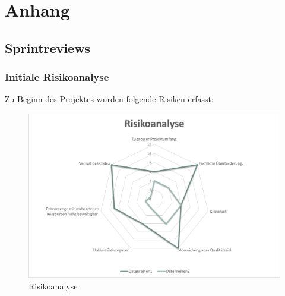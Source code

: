 % 

\chapter{Anhang}
\label{app:sec:Anhang}



%

\section{Sprintreviews}
\subsection*{Initiale Risikoanalyse}
Zu Beginn des Projektes wurden folgende Risiken erfasst:

\begin{figure}[htb]
	\centering
	\includegraphics[keepaspectratio,width=\linewidth]{img/Initiale Risikoanalyse.png}
	\caption{Risikoanalyse}
	\label{fig:InitialeRisikoanalyse}
\end{figure}

